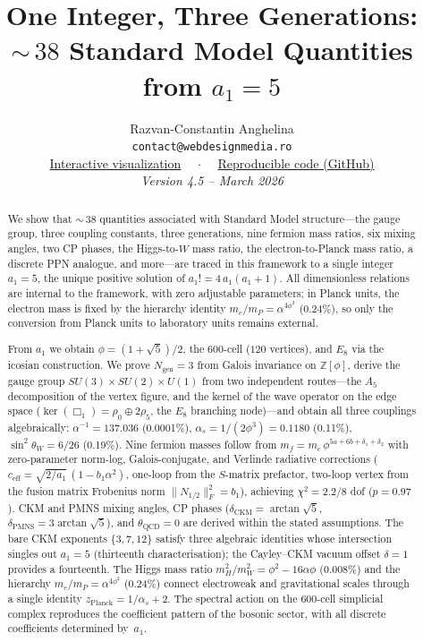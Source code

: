 \documentclass[12pt,a4paper]{article}
\title{\textbf{One Integer, Three Generations:\\
${\sim}\,38$ Standard Model Quantities from $a_1 = 5$}}
\author{
Razvan-Constantin Anghelina\\
\texttt{contact@webdesignmedia.ro}\\[0.3em]
\href{https://webdesignmedia.ro/hjer_particles/}{Interactive visualization} ~~$\cdot$~~ \href{https://github.com/razvananghelina/One-Integer-Three-Generations}{Reproducible code (GitHub)}\\[1em]
\textit{Version 4.5 -- March 2026}
}
\date{}
\theoremstyle{definition}
\begin{document}
\maketitle

\begin{abstract}
We show that ${\sim}\,38$ quantities associated with Standard Model structure---the gauge group, three coupling constants, three generations, nine fermion mass ratios, six mixing angles, two CP phases, the Higgs-to-$W$ mass ratio, the electron-to-Planck mass ratio, a discrete PPN analogue, and more---are traced in this framework to a single integer $a_1 = 5$, the unique positive solution of $a_1! = 4\,a_1(a_1+1)$.  All dimensionless relations are internal to the framework, with zero adjustable parameters; in Planck units, the electron mass is fixed by the hierarchy identity $m_e/m_P = \alpha^{4\phi^2}$ (0.24\%), so only the conversion from Planck units to laboratory units remains external.

From $a_1$ we obtain $\phi = (1+\sqrt{5})/2$, the 600-cell ($120$ vertices), and $E_8$ via the icosian construction.  We prove $N_{\text{gen}} = 3$ from Galois invariance on $\mathbb{Z}[\phi]$, derive the gauge group $SU(3)\!\times\!SU(2)\!\times\!U(1)$ from two independent routes---the $A_5$ decomposition of the vertex figure, and the kernel of the wave operator on the edge space ($\ker(\Box_1) = \rho_0 \oplus 2\rho_5$, the $E_8$ branching node)---and obtain all three couplings algebraically: $\alpha^{-1} = 137.036$ (0.0001\%), $\alpha_s = 1/(2\phi^3) = 0.1180$ (0.11\%), $\sin^2\theta_W = 6/26$ (0.19\%).  Nine fermion masses follow from $m_f = m_e\,\phi^{5a+6b+\delta_1+\delta_2}$ with zero-parameter norm-log, Galois-conjugate, and Verlinde radiative corrections ($c_{\mathrm{eff}} = \sqrt{2/a_1}\,(1-b_1\alpha^2)$, one-loop from the $S$-matrix prefactor, two-loop vertex from the fusion matrix Frobenius norm $\|N_{1/2}\|_F^2 = b_1$), achieving $\chi^2 = 2.2/8$ dof ($p = 0.97$).  CKM and PMNS mixing angles, CP phases ($\delta_{\text{CKM}} = \arctan\sqrt{5}$, $\delta_{\text{PMNS}} = 3\arctan\sqrt{5}$), and $\theta_{\text{QCD}} = 0$ are derived within the stated assumptions.  The bare CKM exponents $\{3,7,12\}$ satisfy three algebraic identities whose intersection singles out $a_1 = 5$ (thirteenth characterisation); the Cayley--CKM vacuum offset $\delta = 1$ provides a fourteenth.  The Higgs mass ratio $m_H^2/m_W^2 = \phi^2 - 16\alpha\phi$ (0.008\%) and the hierarchy $m_e/m_P = \alpha^{4\phi^2}$ (0.24\%) connect electroweak and gravitational scales through a single identity $z_{\text{Planck}} = 1/\alpha_s + 2$.  The spectral action on the 600-cell simplicial complex reproduces the coefficient pattern of the bosonic sector, with all discrete coefficients determined by~$a_1$.


\end{abstract}
\end{document}
